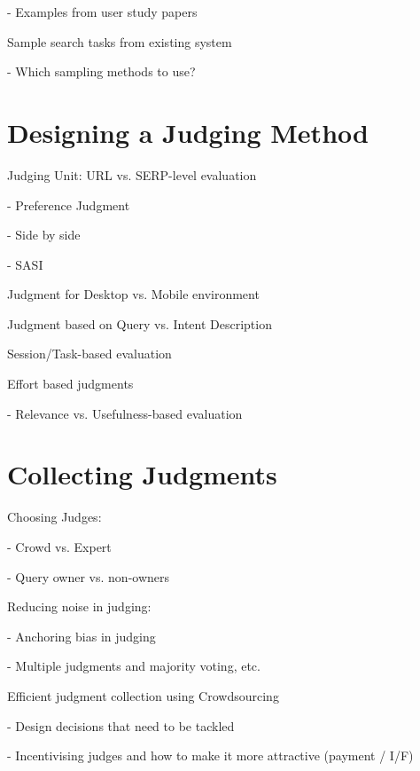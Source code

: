 \documentclass[openany]{now} %
\newcommand{\newpar}{\bigskip\noindent}
\begin{document}
- Examples from user study papers

\newpar
Sample search tasks from existing system

- Which sampling methods to use? \cite{Baeza-Yates:2015}

\section{Designing a Judging Method}

Judging Unit: URL vs. SERP-level evaluation

- Preference Judgment  \cite{Chandar2013} \cite{CarteretteBCD08}

- Side by side \cite{Thomas2006} \cite{Kim:2013}

- SASI \cite{Bailey2010} 

\newpar
Judgment for Desktop vs. Mobile environment \cite{Verma:2016:CRMD}

\newpar
Judgment based on Query vs. Intent Description \cite{Yilmaz:2014:EID}

\newpar
Session/Task-based evaluation \cite{Moraveji:2011} \cite{Xu:2009}

\newpar
Effort based judgments \cite{Yilmaz:2014} \cite{Verma:2016:EBJ}

- Relevance vs. Usefulness-based evaluation 

\section{Collecting Judgments}

Choosing Judges: 

- Crowd vs. Expert \cite{Kazai:2013} \cite{Alonso20121053}

- Query owner vs. non-owners \cite{Chouldechova:2013}

\newpar
Reducing noise in judging: 

- Anchoring bias in judging \cite{Shokouhi:2015}

- Multiple judgments and majority voting, etc. \cite{Venanzi:2014}

\cite{aroyo2013measuring} \cite{aroyo2013crowd}

\newpar
Efficient judgment collection using Crowdsourcing

- Design decisions that need to be tackled  \cite{Blanco:2011} \cite{Kazai2012} \cite{Alonso2012} \cite{Alonso:2015} \cite{Scholer:2013} 

- Incentivising judges and how to make it more attractive (payment / I/F)
\cite{Megorskaya2015} \cite{Davtyan2015}  \cite{Rokicki:2014}  \cite{Eickhoff:2012}
\end{document}
